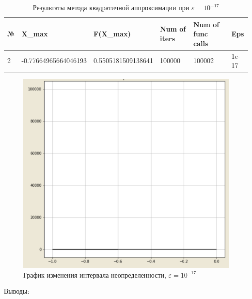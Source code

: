 \documentclass[10pt]{article}
\begin{document}
\begin{enumerate}
\begin{table}[H]
\caption{Результаты метода квадратичной аппроксимации при $\varepsilon =10^{-17}$}
\begin{center}
\begin{tabular}{|l|l|l|l|l|l|}
\hline
№ & X\_max    & F(X\_max) & Num of iters & Num of func calls & Eps  \\
\hline
    2 & -0.77664965664046193          &    0.5505181509138641  &              100000 &                  100002 &
1e-17 \\
\hline
\end{tabular}
\end{center}
\end{table}

\begin{figure}[H]
\centering
\includegraphics[width=0.8\linewidth]{9.png}
\caption{График изменения интервала неопределенности, $\varepsilon = 10^{-17}$}
\label{fig:image1}
\end{figure}


\end{enumerate}
\newpage
\begin{center}
\begin{large}
Выводы:\\
\end{large}
\end{center}
\end{document}
